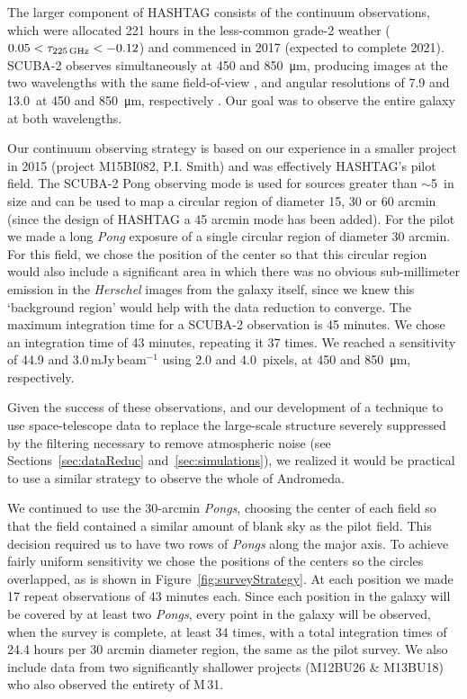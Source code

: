 \documentclass[a4paper,fleqn,usenatbib, twocolumn]{aastex63}
\begin{document}
The larger component of HASHTAG consists of the continuum observations, which were allocated
221 hours in the less-common grade-2 weather ($0.05 < \tau_{\rm 225\,GHz} < -0.12$) and commenced in 2017 (expected to complete 2021). 
SCUBA-2 observes simultaneously at 450 and \SI{850}{\micro\meter}, producing
images at the two wavelengths with the same field-of-view \citep{holland2013}, and angular resolutions of 7.9 and 13.0\arcsec\ at 
450 and \SI{850}{\micro\meter}, respectively \citep{Dempsey2013}.
Our goal was to observe the entire galaxy at both wavelengths.

Our continuum observing strategy is based on our experience in a smaller project in 2015 (project M15BI082, P.I. Smith) and was effectively HASHTAG's pilot
field. The SCUBA-2 Pong observing mode is used for sources greater  than $\sim$5\arcmin\ in size and can be used to map a circular
region of diameter 15, 30 or 60 arcmin (since the design of HASHTAG a 45 arcmin mode has been added). 
For the pilot we made a long {\it Pong} exposure of a single circular region of diameter
30 arcmin. For this field, we chose the position of the center so that this
circular region would also include a significant area in
which there was no obvious sub-millimeter emission in the
{\it Herschel} images from the galaxy itself, since we knew this `background region' would help
with the data reduction to converge. The maximum integration time for a SCUBA-2 observation
is 45 minutes. We chose an integration time of 43 minutes, repeating it
37 times.
We reached a sensitivity of 44.9 and 3.0\,mJy\,beam$^{-1}$
using 2.0 and 4.0\arcsec\ pixels, at 450 and \SI{850}{\micro\meter}, respectively. 

Given the success of these observations, and our development of a technique
to use space-telescope data to replace the large-scale structure severely suppressed  
by the filtering necessary to remove atmospheric noise (see Sections~\ref{sec:dataReduc} and~\ref{sec:simulations}), we realized it would be practical to use a similar strategy to observe the
whole of Andromeda.


We continued to use the 30-arcmin {\it Pongs}, choosing the center of each field so that the field contained a similar 
amount of blank sky as the pilot field. This decision required us to have two rows of {\it Pongs} along the major axis. To achieve fairly uniform sensitivity we chose the positions of the centers so the circles
overlapped, as is shown in Figure~\ref{fig:surveyStrategy}. At each position
we made 17 repeat observations of 43 minutes each. Since each position in the galaxy will be covered by at least two {\it Pongs}, every point in the
galaxy will be observed, when the survey is complete, at least 34 times, with
a total integration times of 24.4 hours per 30 arcmin diameter region, the same as the pilot survey. 
We also include data from two significantly shallower 
projects (M12BU26 \& M13BU18) who also observed the entirety of M\,31. 
\end{document}
